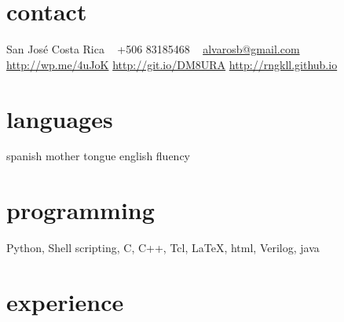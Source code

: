\documentclass[]{friggeri-cv} %
\begin{document}


\begin{aside} %
\section{contact}
San José
Costa Rica
~
+506 83185468
~
\href{mailto:alvarosb@gmail.com}{alvarosb@gmail.com}
\href{http://wp.me/4uJoK}{http://wp.me/4uJoK}
\href{http://git.io/DM8URA}{http://git.io/DM8URA}
\href{http://rngkll.github.io}{http://rngkll.github.io}
\section{languages}
spanish mother tongue
english fluency
\section{programming}
Python,
Shell scripting, C,
C++, Tcl, \LaTeX, html,
Verilog, java
\end{aside}




\section{experience}
\end{document}
